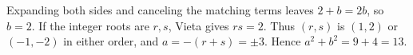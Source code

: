 Expanding both sides and canceling the matching terms leaves $2+b=2b$, so $b=2$. If the integer roots are $r,s$, Vieta gives $rs=2$. Thus $(r,s)$ is $(1,2)$ or $(-1,-2)$ in either order, and $a=-(r+s)=\pm3$. Hence $a^2+b^2=9+4=\boxed{13}$.
